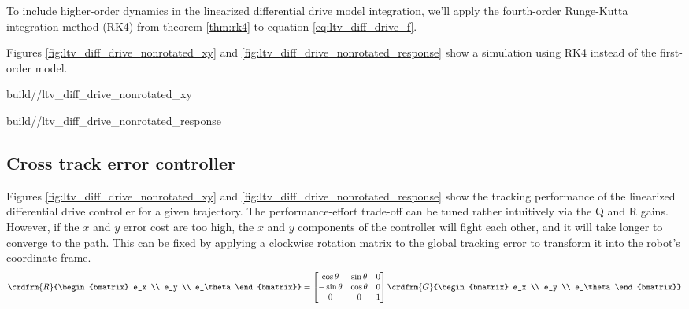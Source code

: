 To include higher-order dynamics in the linearized differential drive model
integration, we'll apply the fourth-order Runge-Kutta integration method (RK4)
from theorem \ref{thm:rk4} to equation \eqref{eq:ltv_diff_drive_f}.

Figures \ref{fig:ltv_diff_drive_nonrotated_xy} and
\ref{fig:ltv_diff_drive_nonrotated_response} show a simulation using RK4
instead of the first-order \gls{model}.
\begin{bookfigure}
  \begin{minisvg}{2}{build/\chapterpath/ltv_diff_drive_nonrotated_xy}
    \caption{Linear time-varying differential drive controller (global reference
        frame formulation) x-y plot}
    \label{fig:ltv_diff_drive_nonrotated_xy}
  \end{minisvg}
  \hfill
  \begin{minisvg}{2}{build/\chapterpath/ltv_diff_drive_nonrotated_response}
    \caption{Linear time-varying differential drive controller (global reference
        frame formulation) response}
    \label{fig:ltv_diff_drive_nonrotated_response}
  \end{minisvg}
\end{bookfigure}

\subsection{Cross track error controller}

Figures \ref{fig:ltv_diff_drive_nonrotated_xy} and
\ref{fig:ltv_diff_drive_nonrotated_response} show the tracking performance of
the linearized differential drive controller for a given trajectory. The
performance-effort trade-off can be tuned rather intuitively via the Q and R
gains. However, if the $x$ and $y$ error cost are too high, the $x$ and $y$
components of the controller will fight each other, and it will take longer to
converge to the path. This can be fixed by applying a clockwise rotation matrix
to the global tracking error to transform it into the robot's coordinate frame.
\begin{equation*}
  \crdfrm{R}{\begin{bmatrix}
    e_x \\
    e_y \\
    e_\theta
  \end{bmatrix}} =
  \begin{bmatrix}
    \cos\theta & \sin\theta & 0 \\
    -\sin\theta & \cos\theta & 0 \\
    0 & 0 & 1
  \end{bmatrix}
  \crdfrm{G}{\begin{bmatrix}
    e_x \\
    e_y \\
    e_\theta
  \end{bmatrix}}
\end{equation*}


